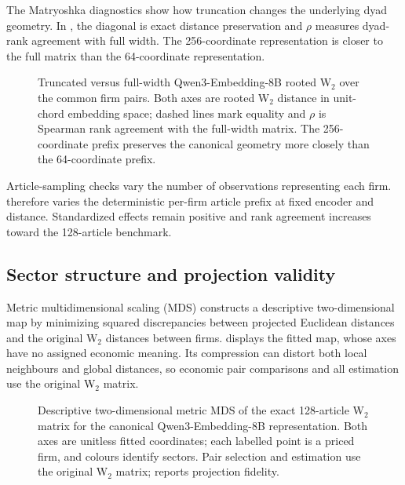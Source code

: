 The Matryoshka diagnostics show how truncation changes the underlying
dyad geometry.
In , the diagonal is exact distance
preservation and $\rho$ measures dyad-rank agreement with full width.
The 256-coordinate representation is closer to the full matrix than the
64-coordinate representation.

\begin{figure}[H]
  \centering
  \caption{Truncated versus full-width Qwen3-Embedding-8B rooted W$_2$ over the
    common firm pairs. Both axes are rooted W$_2$ distance in unit-chord
    embedding space; dashed lines mark equality and $\rho$ is Spearman rank
    agreement with the full-width matrix. The 256-coordinate prefix preserves
  the canonical geometry more closely than the 64-coordinate prefix.}
  \label{fig:matryoshka-preservation}
\end{figure}

Article-sampling checks vary the number of observations representing each firm.
 therefore varies the deterministic
per-firm article prefix at fixed encoder and distance.
Standardized effects remain positive and rank agreement increases toward the
128-article benchmark.



\subsection{Sector structure and projection validity}
\label{sec:projection-validity}
\label{sec:geometric-representation}
\label{sec:geometric-diagnostics}

Metric multidimensional scaling (MDS) constructs a descriptive two-dimensional
map by minimizing squared discrepancies between projected Euclidean distances
and the original W$_2$ distances between firms.
 displays the fitted map, whose axes have no assigned
economic meaning.
Its compression can distort both local neighbours and global distances, so
economic pair comparisons and all estimation use the original W$_2$ matrix.

\begin{figure}[htbp]
  \centering
  \caption{Descriptive two-dimensional metric MDS of the exact 128-article W$_2$
    matrix for the canonical Qwen3-Embedding-8B representation.
    Both axes are unitless fitted coordinates; each labelled point is a
    priced firm, and colours identify sectors.
    Pair selection and estimation use the original W$_2$ matrix;
     reports projection fidelity.
  }
  \label{fig:sector-metric-mds}
\end{figure}

